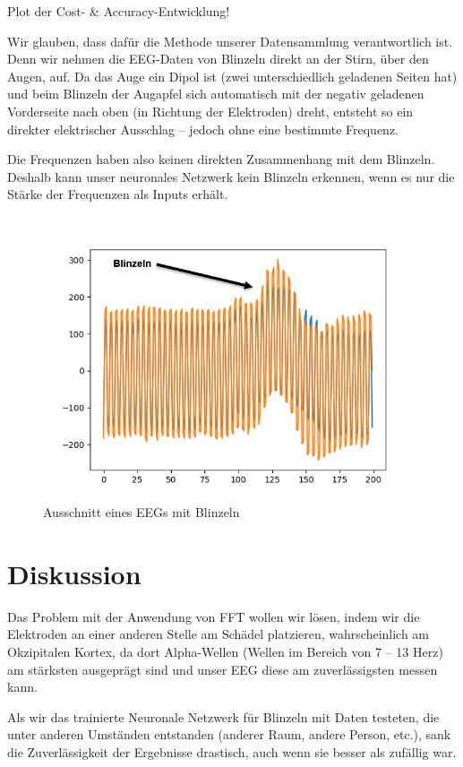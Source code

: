 \documentclass{scrartcl}
\begin{document}
	Plot der Cost- \& Accuracy-Entwicklung!

	Wir glauben, dass dafür die Methode unserer Datensammlung verantwortlich ist. Denn wir nehmen die EEG-Daten von Blinzeln direkt an der Stirn, über den Augen, auf. Da das Auge ein Dipol ist (zwei unterschiedlich geladenen Seiten hat) und beim Blinzeln der Augapfel sich automatisch mit der negativ geladenen Vorderseite nach oben (in Richtung der Elektroden) dreht, entsteht so ein direkter elektrischer Ausschlag – jedoch ohne eine bestimmte Frequenz.
	
	Die Frequenzen haben also keinen direkten Zusammenhang mit dem Blinzeln. Deshalb kann unser neuronales Netzwerk kein Blinzeln erkennen, wenn es nur die Stärke der Frequenzen als Inputs erhält.

	\begin{figure}[h]
		\includegraphics{pictures/blinzeln_ekp_beispiel_pyplot_annotated.png}
		\caption{Ausschnitt eines EEGs mit Blinzeln}
	\end{figure}

	\section{Diskussion}

	Das Problem mit der Anwendung von FFT wollen wir lösen, indem wir die Elektroden an einer anderen Stelle am Schädel platzieren, wahrscheinlich am Okzipitalen Kortex, da dort Alpha-Wellen (Wellen im Bereich von 7 – 13 Herz) am stärksten ausgeprägt sind und unser EEG diese am zuverlässigsten messen kann.

	Als wir das trainierte Neuronale Netzwerk für Blinzeln mit Daten testeten, die unter anderen Umständen entstanden (anderer Raum, andere Person, etc.), sank die Zuverlässigkeit der Ergebnisse drastisch, auch wenn sie besser als zufällig war.
\end{document}

